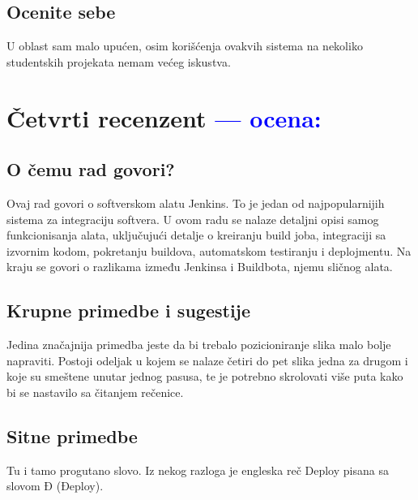 \documentclass[a4paper]{report}
\newcommand{\odgovor}[1]{\textcolor{blue}{#1}}
\begin{document}
\section{Ocenite sebe}

U oblast sam malo upućen, osim korišćenja ovakvih sistema na nekoliko studentskih projekata nemam većeg iskustva.


\chapter{Četvrti recenzent \odgovor{--- ocena:} }
\section{O čemu rad govori?}
Ovaj rad govori o softverskom alatu Jenkins. To je jedan od najpopularnijih sistema za integraciju softvera. U ovom radu se nalaze detaljni opisi samog funkcionisanja alata, uključujući detalje o kreiranju build joba, integraciji sa izvornim kodom, pokretanju buildova, automatskom testiranju i deplojmentu. Na kraju se govori o razlikama između Jenkinsa i Buildbota, njemu sličnog alata.


\section{Krupne primedbe i sugestije}
Jedina značajnija primedba jeste da bi trebalo pozicioniranje slika malo bolje napraviti. Postoji odeljak u kojem se nalaze četiri do pet slika jedna za drugom i koje su smeštene unutar jednog pasusa, te je potrebno skrolovati više puta kako bi se nastavilo sa čitanjem rečenice.

\section{Sitne primedbe}
Tu i tamo progutano slovo. Iz nekog razloga je engleska reč Deploy pisana sa slovom Đ (Đeploy).
\end{document}

